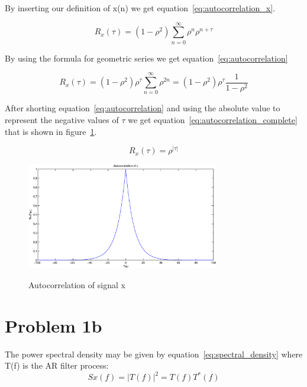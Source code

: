	By inserting our definition of x(n) we get equation~\ref{eq:autocorrelation_x}.
	
	\begin{equation}
		R_x(\tau)=(1-\rho ^2)\sum_{n=0}^{\infty}\rho ^n\rho^{n+\tau}
		\label{eq:autocorrelation_x}
	\end{equation}
	
	By using the formula for geometric series we get equation~\ref{eq:autocorrelation}
	
	\begin{equation}
		R_x(\tau)=(1-\rho ^2)\rho^{\tau }\sum_{n=0}^{\infty}\rho^{2n}=(1-\rho ^2)\rho^{\tau }\frac{1}{1-\rho ^2}
		\label{eq:autocorrelation}
	\end{equation}
	
	After shorting equation~\ref{eq:autocorrelation} and using the absolute value to represent the negative values of $\tau$ we get equation~\ref{eq:autocorrelation_complete} that is shown in figure~\ref{fig:autocorrelation}.
	
	\begin{equation}
		R_x(\tau)=\rho^{|\tau |}
		\label{eq:autocorrelation_complete}
	\end{equation}

	
	\begin{figure}
	  \centering
	  \includegraphics[width=0.75\textwidth]{img/Oppgave1a}
	  \label{fig:autocorrelation}
	  \caption{Autocorrelation of signal x}
	\end{figure}
	
  
  
  \section{Problem 1b}
	The power spectral density may be given by equation~\ref{eq:spectral_density} where T(f) is the AR filter process:
	\begin{equation}
		Sx(f)=|T(f)|^2=T(f)T^*(f)
		\label{eq:spectral_density}
	\end{equation}
	
